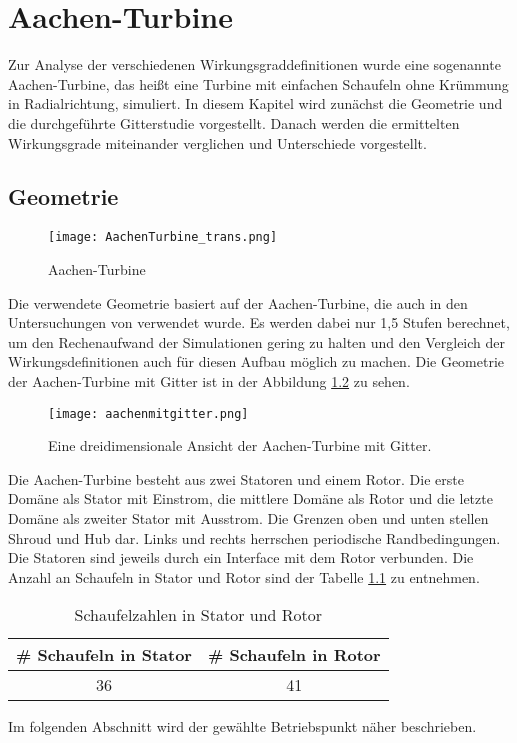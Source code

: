 \chapter{Aachen-Turbine}
\label{cha:aachen}
Zur Analyse der verschiedenen Wirkungsgraddefinitionen wurde eine sogenannte Aachen-Turbine, das heißt eine Turbine mit einfachen Schaufeln ohne Krümmung in Radialrichtung, simuliert. In diesem Kapitel wird zunächst die Geometrie und die durchgeführte Gitterstudie vorgestellt. Danach werden die ermittelten Wirkungsgrade miteinander verglichen und Unterschiede vorgestellt.
\section{Geometrie}
\label{sec:aachengeo}
  \begin{figure}[htbp]
	\centering
	\texttt{[image: AachenTurbine\_trans.png]}
	\caption{Aachen-Turbine} \label{fig:imgAachenTurbine}
\end{figure} 
Die verwendete Geometrie basiert auf der Aachen-Turbine, die auch in den Untersuchungen von \cite{ufi2001YaoDavis} 
verwendet wurde. Es werden dabei nur 1,5 Stufen berechnet, um den Rechenaufwand der Simulationen gering zu halten und den Vergleich der Wirkungsdefinitionen auch für diesen Aufbau möglich zu machen. Die Geometrie der Aachen-Turbine mit Gitter ist in der Abbildung \ref{fig:aachengebiet} zu sehen. 
\begin{figure}[htbp]
	\centering
	\texttt{[image: aachenmitgitter.png]}
	\caption{Eine dreidimensionale Ansicht der Aachen-Turbine mit Gitter.}
	\label{fig:aachengebiet}
\end{figure}
Die Aachen-Turbine besteht aus zwei Statoren und einem Rotor. Die erste Domäne als Stator mit Einstrom, die mittlere Domäne als Rotor und die letzte Domäne als zweiter Stator mit Ausstrom. Die Grenzen oben und unten stellen Shroud und Hub dar. Links und rechts herrschen periodische Randbedingungen. Die Statoren sind jeweils durch ein Interface mit dem Rotor verbunden. Die Anzahl an Schaufeln in Stator und Rotor sind der Tabelle \ref{tab:aachenabmessungen} zu entnehmen.\newline
\begin{table}[htbp]
\centering
\label{tab:aachenabmessungen}
\caption{Schaufelzahlen in Stator und Rotor}
\begin{tabular}{ c| c}
\# Schaufeln in Stator&\# Schaufeln in Rotor\\
\hline
36&41\\
\end{tabular}
\end{table}
Im folgenden Abschnitt wird der gewählte Betriebspunkt näher beschrieben.
